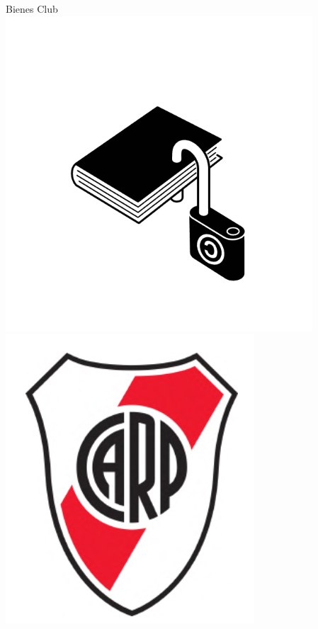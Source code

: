 \documentclass{beamer}
\begin{document}
\begin{frame}{Bienes Club}
    \centering
    \includegraphics[scale=0.5]{../Figures/derechos_autor.png}
    \includegraphics[scale=0.5]{../Figures/Escudo_del_C_A_River_Plate.png}
\end{frame}
\end{document}
